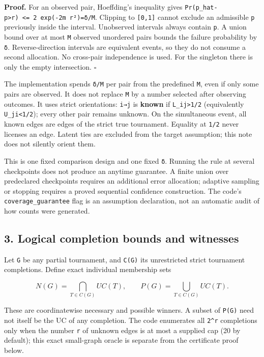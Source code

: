 \documentclass[
  11pt,
]{article}
\begin{document}
\textbf{Proof.} For an observed pair, Hoeffding's inequality gives
\texttt{Pr(\textbar{}p\_hat-p\textbar{}\textgreater{}r)\ \textless{}=\ 2\ exp(-2m\ r²)=δ/M}.
Clipping to \texttt{{[}0,1{]}} cannot exclude an admissible \texttt{p}
previously inside the interval. Unobserved intervals always contain
\texttt{p}. A union bound over at most \texttt{M} observed unordered
pairs bounds the failure probability by \texttt{δ}. Reverse-direction
intervals are equivalent events, so they do not consume a second
allocation. No cross-pair independence is used. For the singleton there
is only the empty intersection. \(\square\)

The implementation spends \texttt{δ/M} per pair from the predefined
\texttt{M}, even if only some pairs are observed. It does not replace
\texttt{M} by a number selected after observing outcomes. It uses strict
orientations: \texttt{i→j} is \textbf{known} if
\texttt{L\_ij\textgreater{}1/2} (equivalently
\texttt{U\_ji\textless{}1/2}); every other pair remains unknown. On the
simultaneous event, all known edges are edges of the strict true
tournament. Equality at \texttt{1/2} never licenses an edge. Latent ties
are excluded from the target assumption; this note does not silently
orient them.

This is one fixed comparison design and one fixed \texttt{δ}. Running
the rule at several checkpoints does not produce an anytime guarantee. A
finite union over predeclared checkpoints requires an additional error
allocation; adaptive sampling or stopping requires a proved sequential
confidence construction. The code's \texttt{coverage\_guarantee} flag is
an assumption declaration, not an automatic audit of how counts were
generated.

\hypertarget{logical-completion-bounds-and-witnesses}{%
\subsection{3. Logical completion bounds and
witnesses}\label{logical-completion-bounds-and-witnesses}}

Let \texttt{G} be any partial tournament, and \texttt{C(G)} its
unrestricted strict tournament completions. Define exact individual
membership sets

\[
N(G)=\bigcap_{T\in C(G)} UC(T),\qquad
P(G)=\bigcup_{T\in C(G)} UC(T).
\]

These are coordinatewise necessary and possible winners. A subset of
\texttt{P(G)} need not itself be the UC of any completion. The code
enumerates all \texttt{2\^{}r} completions only when the number
\texttt{r} of unknown edges is at most a supplied cap (20 by default);
this exact small-graph oracle is separate from the certificate proof
below.
\end{document}
